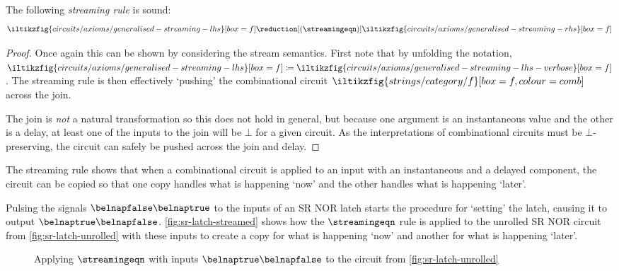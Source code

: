 \documentclass{lmcs}
\begin{document}
\begin{lem}[Streaming]\label{lem:streaming}
    The following \emph{streaming rule} is sound: \[
        \iltikzfig{circuits/axioms/generalised-streaming-lhs}[box=f]
        \reduction[(\streamingeqn)]
        \iltikzfig{circuits/axioms/generalised-streaming-rhs}[box=f]
    \]
\end{lem}
\begin{proof}
    Once again this can be shown by considering the stream semantics.
    First note that by unfolding the notation, \(
    \iltikzfig{circuits/axioms/generalised-streaming-lhs}[box=f]
    \coloneqq
    \iltikzfig{circuits/axioms/generalised-streaming-lhs-verbose}[box=f]
    \).
    The streaming rule is then effectively `pushing' the combinational circuit
    \(\iltikzfig{strings/category/f}[box=f,colour=comb]\) across the join.

    The join is \emph{not} a natural transformation so this does not hold in
    general, but because one argument is an instantaneous value and the other
    is a delay, at least one of the inputs to the join will be \(\bot\) for a
    given circuit.
    As the interpretations of combinational circuits must be
    \(\bot\)-preserving, the circuit can safely be pushed across the join and
    delay.
\end{proof}

The streaming rule shows that when a combinational circuit is applied to an
input with an instantaneous and a delayed component, the circuit can be copied
so that one copy handles what is happening `now' and the other handles what is
happening `later'.

\begin{exa}\label{ex:streaming}
    Pulsing the signals \(\belnapfalse\belnaptrue\) to the inputs of an SR NOR
    latch starts the procedure for `setting' the latch, causing it to output
    \(\belnaptrue\belnapfalse\).
    \autoref{fig:sr-latch-streamed} shows how the \(\streamingeqn\) rule is applied
    to the unrolled SR NOR circuit from
    \autoref{fig:sr-latch-unrolled} with these inputs to create a copy for what
    is happening `now' and another for what is happening `later'.
\end{exa}

\begin{figure}
    \centering
    \caption{
        Applying \(\streamingeqn\) with inputs \(\belnaptrue\belnapfalse\) to
        the circuit from \autoref{fig:sr-latch-unrolled}
    }
    \label{fig:sr-latch-streamed}
\end{figure}
\end{document}
